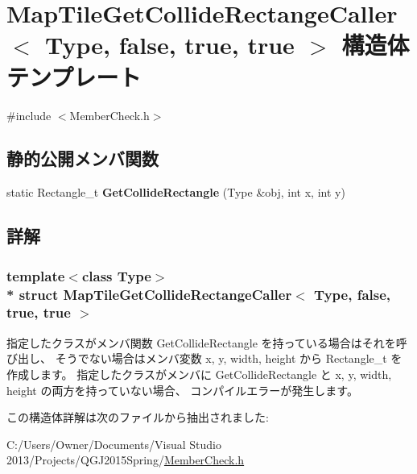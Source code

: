 \hypertarget{struct_map_tile_get_collide_rectange_caller_3_01_type_00_01false_00_01true_00_01true_01_4}{}\section{Map\+Tile\+Get\+Collide\+Rectange\+Caller$<$ Type, false, true, true $>$ 構造体テンプレート}
\label{struct_map_tile_get_collide_rectange_caller_3_01_type_00_01false_00_01true_00_01true_01_4}


 




{\ttfamily \#include $<$Member\+Check.\+h$>$}

\subsection*{静的公開メンバ関数}
\begin{DoxyCompactItemize}
\item 
static Rectangle\+\_\+t {\bfseries Get\+Collide\+Rectangle} (Type \&obj, int x, int y)\hypertarget{struct_map_tile_get_collide_rectange_caller_3_01_type_00_01false_00_01true_00_01true_01_4_ae1b6ea5c63fe5c47a7eea48642444d28}{}\label{struct_map_tile_get_collide_rectange_caller_3_01_type_00_01false_00_01true_00_01true_01_4_ae1b6ea5c63fe5c47a7eea48642444d28}

\end{DoxyCompactItemize}


\subsection{詳解}
\subsubsection*{template$<$class Type$>$\\*
struct Map\+Tile\+Get\+Collide\+Rectange\+Caller$<$ Type, false, true, true $>$}



指定したクラスがメンバ関数 Get\+Collide\+Rectangle を持っている場合はそれを呼び出し、 そうでない場合はメンバ変数 x, y, width, height から Rectangle\+\_\+t を作成します。 指定したクラスがメンバに Get\+Collide\+Rectangle と x, y, width, height の両方を持っていない場合、 コンパイルエラーが発生します。 

この構造体詳解は次のファイルから抽出されました\+:\begin{DoxyCompactItemize}
\item 
C\+:/\+Users/\+Owner/\+Documents/\+Visual Studio 2013/\+Projects/\+Q\+G\+J2015\+Spring/\hyperlink{_member_check_8h}{Member\+Check.\+h}\end{DoxyCompactItemize}
